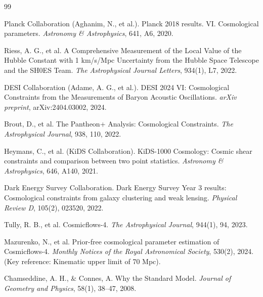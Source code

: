 \documentclass[12pt, a4paper]{article}
\theoremstyle{plain}
\theoremstyle{definition}
\begin{document}
\begin{thebibliography}{99}
\small

Planck Collaboration (Aghanim, N., et al.).
\newblock Planck 2018 results. VI. Cosmological parameters.
\newblock \textit{Astronomy \& Astrophysics}, 641, A6, 2020.

Riess, A. G., et al.
\newblock A Comprehensive Measurement of the Local Value of the Hubble Constant with 1 km/s/Mpc Uncertainty from the Hubble Space Telescope and the SH0ES Team.
\newblock \textit{The Astrophysical Journal Letters}, 934(1), L7, 2022.

DESI Collaboration (Adame, A. G., et al.).
\newblock DESI 2024 VI: Cosmological Constraints from the Measurements of Baryon Acoustic Oscillations.
\newblock \textit{arXiv preprint}, arXiv:2404.03002, 2024.

Brout, D., et al.
\newblock The Pantheon+ Analysis: Cosmological Constraints.
\newblock \textit{The Astrophysical Journal}, 938, 110, 2022.

Heymans, C., et al. (KiDS Collaboration).
\newblock KiDS-1000 Cosmology: Cosmic shear constraints and comparison between two point statistics.
\newblock \textit{Astronomy \& Astrophysics}, 646, A140, 2021.

Dark Energy Survey Collaboration.
\newblock Dark Energy Survey Year 3 results: Cosmological constraints from galaxy clustering and weak lensing.
\newblock \textit{Physical Review D}, 105(2), 023520, 2022.

Tully, R. B., et al.
\newblock Cosmicflows-4.
\newblock \textit{The Astrophysical Journal}, 944(1), 94, 2023.

Mazurenko, N., et al.
\newblock Prior-free cosmological parameter estimation of Cosmicflows-4.
\newblock \textit{Monthly Notices of the Royal Astronomical Society}, 530(2), 2024. 
\newblock (Key reference: Kinematic upper limit of 70 Mpc).

Chamseddine, A. H., \& Connes, A.
\newblock Why the Standard Model.
\newblock \textit{Journal of Geometry and Physics}, 58(1), 38–47, 2008.


\end{thebibliography}
\end{document}
